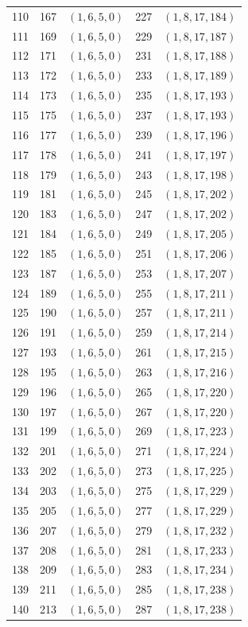 \begin{center}
\begin{longtable}{@{}rrlrl@{}}
110 & 167 & $(1,6,5,0)$ & 227 & $(1,8,17,184)$\\
111 & 169 & $(1,6,5,0)$ & 229 & $(1,8,17,187)$\\
112 & 171 & $(1,6,5,0)$ & 231 & $(1,8,17,188)$\\
113 & 172 & $(1,6,5,0)$ & 233 & $(1,8,17,189)$\\
114 & 173 & $(1,6,5,0)$ & 235 & $(1,8,17,193)$\\
115 & 175 & $(1,6,5,0)$ & 237 & $(1,8,17,193)$\\
116 & 177 & $(1,6,5,0)$ & 239 & $(1,8,17,196)$\\
117 & 178 & $(1,6,5,0)$ & 241 & $(1,8,17,197)$\\
118 & 179 & $(1,6,5,0)$ & 243 & $(1,8,17,198)$\\
119 & 181 & $(1,6,5,0)$ & 245 & $(1,8,17,202)$\\
120 & 183 & $(1,6,5,0)$ & 247 & $(1,8,17,202)$\\
121 & 184 & $(1,6,5,0)$ & 249 & $(1,8,17,205)$\\
122 & 185 & $(1,6,5,0)$ & 251 & $(1,8,17,206)$\\
123 & 187 & $(1,6,5,0)$ & 253 & $(1,8,17,207)$\\
124 & 189 & $(1,6,5,0)$ & 255 & $(1,8,17,211)$\\
125 & 190 & $(1,6,5,0)$ & 257 & $(1,8,17,211)$\\
126 & 191 & $(1,6,5,0)$ & 259 & $(1,8,17,214)$\\
127 & 193 & $(1,6,5,0)$ & 261 & $(1,8,17,215)$\\
128 & 195 & $(1,6,5,0)$ & 263 & $(1,8,17,216)$\\
129 & 196 & $(1,6,5,0)$ & 265 & $(1,8,17,220)$\\
130 & 197 & $(1,6,5,0)$ & 267 & $(1,8,17,220)$\\
131 & 199 & $(1,6,5,0)$ & 269 & $(1,8,17,223)$\\
132 & 201 & $(1,6,5,0)$ & 271 & $(1,8,17,224)$\\
133 & 202 & $(1,6,5,0)$ & 273 & $(1,8,17,225)$\\
134 & 203 & $(1,6,5,0)$ & 275 & $(1,8,17,229)$\\
135 & 205 & $(1,6,5,0)$ & 277 & $(1,8,17,229)$\\
136 & 207 & $(1,6,5,0)$ & 279 & $(1,8,17,232)$\\
137 & 208 & $(1,6,5,0)$ & 281 & $(1,8,17,233)$\\
138 & 209 & $(1,6,5,0)$ & 283 & $(1,8,17,234)$\\
139 & 211 & $(1,6,5,0)$ & 285 & $(1,8,17,238)$\\
140 & 213 & $(1,6,5,0)$ & 287 & $(1,8,17,238)$\\
\bottomrule\end{longtable}\end{center}
